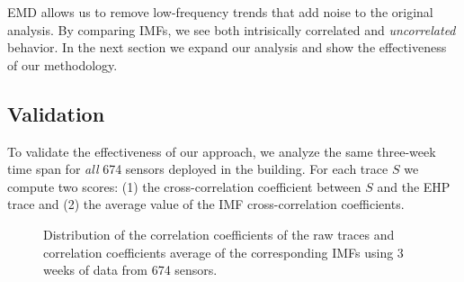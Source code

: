 EMD allows us to remove low-frequency trends that add noise to the original analysis.
By comparing IMFs, we see both intrisically correlated and \emph{uncorrelated} behavior.  In the next
section we expand our analysis and show the effectiveness of our methodology. 


\subsection{Validation}
To validate the effectiveness of our approach, we analyze the same three-week time span for \emph{all} 674 
sensors deployed in the building.
For each trace $S$ we compute two scores: (1) the cross-correlation coefficient between $S$ and the EHP trace
and (2) the average value of the IMF cross-correlation coefficients.

\begin{figure}[tbh!]
\centering
 \caption{Distribution of the correlation coefficients of the raw traces and correlation coefficients average of the corresponding IMFs using 3 weeks of data from 674 sensors.}
\label{fig:histo}
\end{figure}

